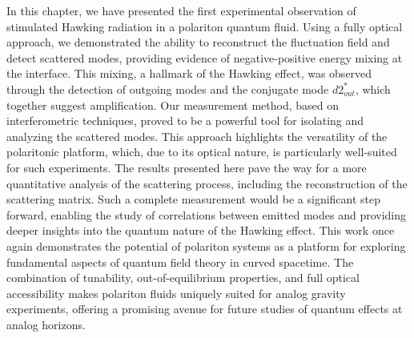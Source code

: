 In this chapter, we have presented the first experimental observation of stimulated Hawking radiation in a polariton quantum fluid. Using a fully optical approach, we demonstrated the ability to reconstruct the fluctuation field and detect scattered modes, providing evidence of negative-positive energy mixing at the interface.
 This mixing, a hallmark of the Hawking effect, was observed through the detection of outgoing modes and the conjugate mode \(d2_{out}^*\), which together suggest amplification.
Our measurement method, based on interferometric techniques, proved to be a powerful tool for isolating and analyzing the scattered modes. This approach highlights the versatility of the polaritonic platform, which, due to its optical nature, is particularly well-suited for such experiments. 
The results presented here pave the way for a more quantitative analysis of the scattering process, including the reconstruction of the scattering matrix. Such a complete measurement would be a significant step forward, enabling the study of correlations between emitted modes and providing deeper insights into the quantum nature of the Hawking effect.
This work once again demonstrates the potential of polariton systems as a platform for exploring fundamental aspects of quantum field theory in curved spacetime. The combination of tunability, out-of-equilibrium properties, and full optical accessibility makes polariton fluids uniquely suited for analog gravity experiments, offering a promising avenue for future studies of quantum effects at analog horizons.